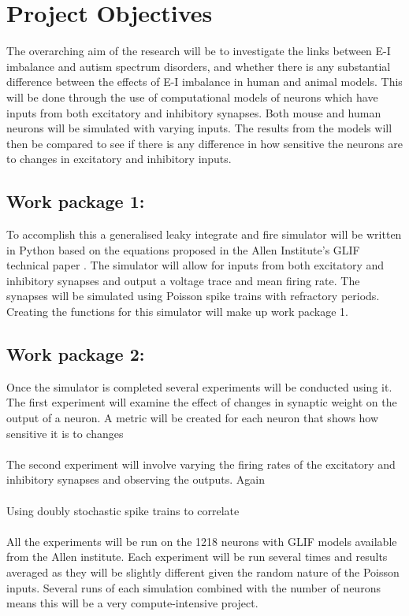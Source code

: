 \documentclass{epsrc}
\begin{document}
\section{Project Objectives}
\noindent
The overarching aim of the research will be to investigate the links between E-I imbalance and autism spectrum disorders, and whether there is any substantial difference between the effects of E-I imbalance in human and animal models. This will be done through the use of computational models of neurons which have inputs from both excitatory and inhibitory synapses. Both mouse and human neurons will be simulated with varying inputs. The results from the models will then be compared to see if there is any difference in how sensitive the neurons are to changes in excitatory and inhibitory inputs.
\\
\subsection{Work package 1:}
\noindent
To accomplish this a generalised leaky integrate and fire simulator will be written in Python based on the equations proposed in the Allen Institute's GLIF technical paper \cite{allen2017GLIF}. The simulator will allow for inputs from both excitatory and inhibitory synapses and output a voltage trace and mean firing rate. The synapses will be simulated using Poisson spike trains with refractory periods. Creating the functions for this simulator will make up work package 1.
\\
\subsection{Work package 2:}
\noindent
Once the simulator is completed several experiments will be conducted using it. 
The first experiment will examine the effect of changes in synaptic weight on the output of a neuron. A metric will be created for each neuron that shows how sensitive it is to changes  
\\\\
The second experiment will involve varying the firing rates of the excitatory and inhibitory synapses and observing the outputs. Again 
\\\\
Using doubly stochastic spike trains to correlate
\\\\
All the experiments will be run on the 1218 neurons with GLIF models available from the Allen institute. Each experiment will be run several times and results averaged as they will be slightly different given the random nature of the Poisson inputs. Several runs of each simulation combined with the number of neurons means this will be a very compute-intensive project.
\\
\end{document}
